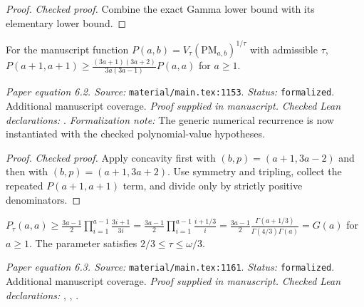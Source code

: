 \begin{proof}
\leanok
{}
\textit{Checked proof.} Combine the exact Gamma lower bound with its elementary lower bound.
\end{proof}

\renewcommand{\thetheorem}{6.2}
\begin{equationresult}
\label{eq:PM-recurrence}
\manuscriptproof
{}
\leanok
For the manuscript function $P(a,b)=V_\tau(\mathrm{PM}_{a,b})^{1/\tau}$ with admissible $\tau$, $P(a+1,a+1)\ge\frac{(3a+1)(3a+2)}{3a(3a-1)}P(a,a)$ for $a\ge1$.
\end{equationresult}

\noindent\textit{Paper equation 6.2. Source:} \texttt{material/main.tex:1153}.
\textit{Status:} \texttt{formalized}. Additional manuscript coverage.
\textit{Proof supplied in manuscript.}
\textit{Checked Lean declarations:} .
\textit{Formalization note:} The generic numerical recurrence is now instantiated with the checked polynomial-value hypotheses.

\begin{proof}
\leanok
{}
\textit{Checked proof.} Apply concavity first with $(b,p)=(a+1,3a-2)$ and then with $(b,p)=(a+1,3a+2)$. Use symmetry and tripling, collect the repeated $P(a+1,a+1)$ term, and divide only by strictly positive denominators.
\end{proof}

\renewcommand{\thetheorem}{6.3}
\begin{equationresult}
\label{eq:PM-Gamma}
\manuscriptproof
{}
\leanok
$P_\tau(a,a)\ge\frac{3a-1}{2}\prod_{i=1}^{a-1}\frac{3i+1}{3i}=\frac{3a-1}{2}\prod_{i=1}^{a-1}\frac{i+1/3}{i}=\frac{3a-1}{2}\frac{\Gamma(a+1/3)}{\Gamma(4/3)\Gamma(a)}=G(a)$ for $a\ge1$. The parameter satisfies $2/3\le\tau\le\omega/3$.
\end{equationresult}

\noindent\textit{Paper equation 6.3. Source:} \texttt{material/main.tex:1161}.
\textit{Status:} \texttt{formalized}. Additional manuscript coverage.
\textit{Proof supplied in manuscript.}
\textit{Checked Lean declarations:} , , .

